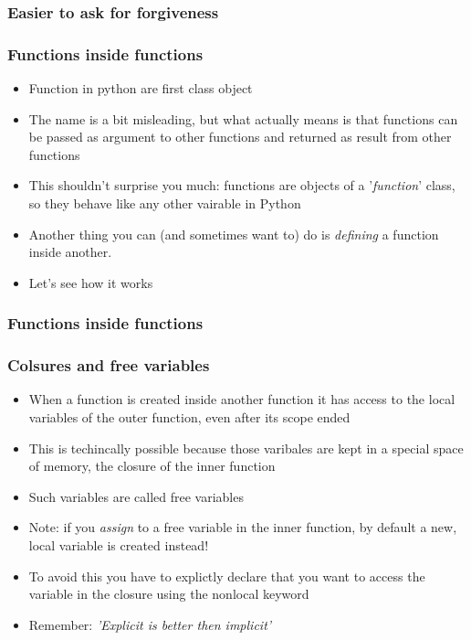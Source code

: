 \documentclass[9pt]{beamer}
\begin{document}
\begin{frame}
  \frametitle{Easier to ask for forgiveness}
  
\end{frame}


\begin{frame}
  \frametitle{Functions inside functions}
  \begin{itemize}
    \item Function in python are \alert{first class object}
    \item The name is a bit misleading, but what actually means is that functions
          can be passed as argument to other functions and returned as result from
          other functions
    \item This shouldn't surprise you much: functions are objects of a
          '\emph{function}' class, so they behave like any other vairable in
          Python
    \item Another thing you can (and sometimes want to) do is \emph{defining} a
          function inside another.
    \item Let's see how it works
  \end{itemize}
  
\end{frame}


\begin{frame}
  \frametitle{Functions inside functions}
  
\end{frame}


\begin{frame}
  \frametitle{Colsures and free variables}
  \begin{itemize}
    \item When a function is created inside another function it has access to the local variables
          of the outer function, even after its scope ended
    \item This is techincally possible because those varibales are kept in a special
          space of memory, the \alert{closure} of the inner function
    \item Such variables are called \alert{free variables}
    \item Note: if you \emph{assign} to a free variable in the inner function, 
          by default a new, local variable is created instead!
    \item To avoid this you have to explictly declare that you want to access the variable in
          the closure using the \alert{nonlocal} keyword
    \item Remember: \emph{'Explicit is better then implicit'}
  \end{itemize}
  
\end{frame}
\end{document}
